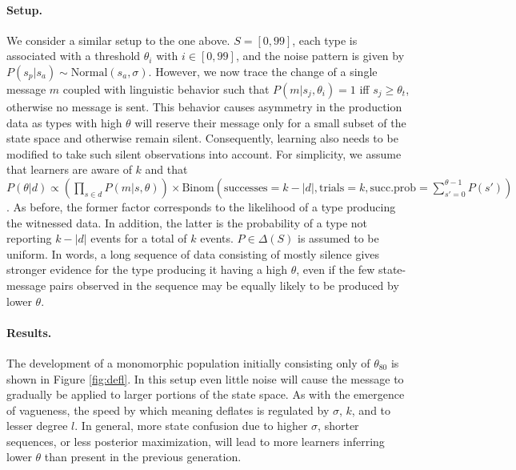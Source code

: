\documentclass[10pt,a4paper]{article}
\begin{document}
\paragraph{Setup.} We consider a similar setup to the one above. $S = [0,99]$, each type is associated with a threshold $\theta_i$ with $i \in [0,99]$, and the noise pattern is given by $P(s_p|s_a) \sim \text{Normal}(s_{a},\sigma)$. However, we now trace the change of a single message $m$ coupled with linguistic behavior such that $P(m|s_j,\theta_i) = 1$ iff $s_j \geq \theta_t$, otherwise no message is sent. This behavior causes asymmetry in the production data as types with high $\theta$ will reserve their message only for a  small subset of the state space and otherwise remain silent. Consequently, learning also needs to be modified to take such silent observations into account. For simplicity, we assume that learners are aware of $k$ and that $P(\theta | d) \propto (\prod_{s \in d} P(m|s,\theta)) \times \text{Binom}(\text{successes} = k-|d|, \text{trials} = k, \text{succ.prob} = \sum_{s'=0}^{\theta-1} P(s'))$. As before, the former factor corresponds to the likelihood of a type producing the witnessed data.  In addition, the latter is the probability of a type not reporting $k-|d|$ events for a total of $k$ events. $P \in \Delta(S)$ is assumed to be uniform. In words, a long sequence of data consisting of mostly silence gives stronger evidence for the type producing it having a high $\theta$, even if the few state-message pairs observed in the sequence may be equally likely to be produced by lower $\theta$. 

\paragraph{Results.} The development of a monomorphic population initially consisting only of $\theta_{80}$ is shown in Figure \ref{fig:defl}. In this setup even little noise will cause the message to gradually be applied to larger portions of the state space. As with the emergence of vagueness, the speed by which meaning deflates is regulated by $\sigma$, $k$, and to lesser degree $l$. In general, more state confusion due to higher $\sigma$, shorter sequences, or less posterior maximization, will lead to more learners inferring lower $\theta$ than present in the previous generation. 
\end{document}
